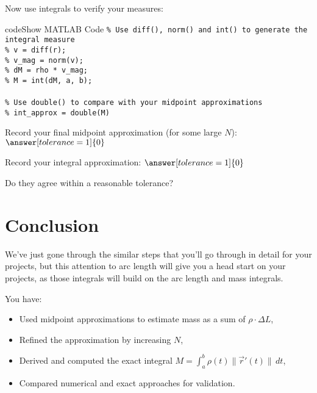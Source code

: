 \documentclass{ximera}
\begin{document}
Now use integrals to verify your measures:

\begin{expandable}{code}{Show MATLAB Code}
\texttt{\% Use diff(), norm() and int() to generate the integral measure}\\
\texttt{\% v = diff(r);}\\
\texttt{\% v\_mag = norm(v);}\\
\texttt{\% dM = rho * v\_mag;}\\
\texttt{\% M = int(dM, a, b);}\\
\\
\texttt{\% Use double() to compare with your midpoint approximations}\\
\texttt{\% int\_approx = double(M)}
\end{expandable}

\begin{problem}
Record your final midpoint approximation (for some large $N$): $\answer[tolerance=1]{0}$

Record your integral approximation: $\answer[tolerance=1]{0}$

Do they agree within a reasonable tolerance? 
\end{problem}

\section*{Conclusion}

We've just gone through the similar steps that you'll go through in detail for your projects, but this attention to arc length will give you a head start on your projects, as those integrals will build on the arc length and mass integrals.

You have:
\begin{itemize}
\item Used midpoint approximations to estimate mass as a sum of $\rho \cdot \Delta L$,
\item Refined the approximation by increasing $N$,
\item Derived and computed the exact integral $M = \int_a^b \rho(t) \|\vec{r}'(t)\| \, dt$,
\item Compared numerical and exact approaches for validation.
\end{itemize}
\end{document}
